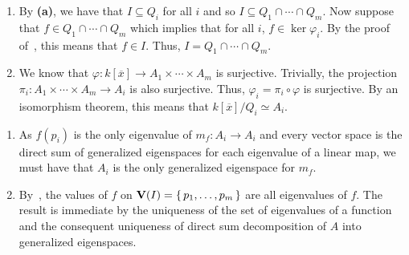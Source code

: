 \documentclass[letterpaper, 11pt, oneside]{book}
\begin{document}
\begin{sol}
\begin{enumerate}
    \item By \textbf{(a)}, we have that $I \subseteq Q_{i}$ for all $i$ and so $I \subseteq Q_{1} \cap \cdots \cap Q_{m}$.
          Now suppose that $f \in Q_{1} \cap \cdots \cap Q_{m}$ which implies that for all $i$, $f \in \ker \varphi_{i}$.
          By the proof of~\cite[\S 4.2, Theorem 2.2]{book:UAG}, this means that $f \in I$.
          Thus, $I = Q_{1} \cap \cdots \cap Q_{m}$.
    \item We know that $\varphi\colon k[\overline{x}] \to A_{1} \times \cdots \times A_{m}$ is surjective.
          Trivially, the projection $\pi_{i}\colon A_{1} \times \cdots \times A_{m} \to A_{i}$ is also surjective.
          Thus, $\varphi_{i} = \pi_{i} \circ \varphi$ is surjective.
          By an isomorphism theorem, this means that $k[\overline{x}] / Q_{i} \simeq A_{i}$.
  \end{enumerate}
\end{sol}

\begin{sol}\label{ex:UAG_4.2.12}
  \begin{enumerate}
    \item As $f(p_{i})$ is the only eigenvalue of $m_{f}\colon A_{i} \to A_{i}$ and every vector space is the direct sum of generalized eigenspaces for each eigenvalue of a linear map, we must have that $A_{i}$ is the only generalized eigenspace for $m_{f}$.
    \item By~\cite[\S 2.4, Theorem 4.5]{book:UAG}, the values of $f$ on $\operatorname{\mathbf{V}}(I) = \set{p_{1}, \ldots, p_{m}}$ are all eigenvalues of $f$.
          The result is immediate by the uniqueness of the set of eigenvalues of a function and the consequent uniqueness of direct sum decomposition of $A$ into generalized eigenspaces.
  \end{enumerate}
\end{sol}

\begin{sol}\label{ex:UAG_4.2.14}
\end{sol}
\end{document}
